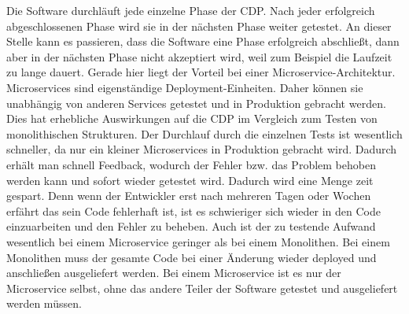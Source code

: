 Die Software durchläuft jede einzelne Phase der CDP. Nach jeder erfolgreich abgeschlossenen Phase wird sie in der nächsten Phase weiter getestet. An dieser Stelle kann es passieren, dass die Software eine Phase erfolgreich abschließt, dann aber in der nächsten Phase nicht akzeptiert wird, weil zum Beispiel die Laufzeit zu lange dauert.\newline
Gerade hier liegt der Vorteil bei einer Microservice-Architektur. Microservices sind eigenständige Deployment-Einheiten. Daher können sie unabhängig von anderen Services getestet und in Produktion gebracht werden. Dies hat erhebliche Auswirkungen auf die CDP im Vergleich zum Testen von monolithischen Strukturen.
Der Durchlauf durch die einzelnen Tests ist wesentlich schneller, da nur ein kleiner Microservices in Produktion gebracht wird. Dadurch erhält man schnell Feedback, wodurch der Fehler bzw. das Problem behoben werden kann und sofort wieder getestet wird. Dadurch wird eine Menge zeit gespart. Denn wenn der Entwickler erst nach mehreren Tagen oder Wochen erfährt das sein Code fehlerhaft ist, ist es schwieriger sich wieder in den Code einzuarbeiten und den Fehler zu beheben.\newline
Auch ist der zu testende Aufwand wesentlich bei einem Microservice geringer als bei einem Monolithen. Bei einem Monolithen muss der gesamte Code bei einer Änderung wieder deployed und anschließen ausgeliefert werden. Bei einem Microservice ist es nur der Microservice selbst, ohne das andere Teiler der Software getestet und ausgeliefert werden müssen.\cite{microservices}\newline\newline


